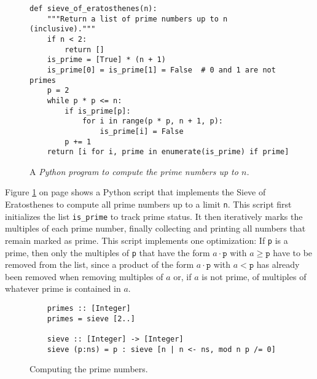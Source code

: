 \begin{figure}[!ht]
\centering
\begin{verbatim}
def sieve_of_eratosthenes(n):
    """Return a list of prime numbers up to n (inclusive)."""
    if n < 2:
        return []    
    is_prime = [True] * (n + 1)
    is_prime[0] = is_prime[1] = False  # 0 and 1 are not primes
    p = 2
    while p * p <= n:
        if is_prime[p]:
            for i in range(p * p, n + 1, p):
                is_prime[i] = False
        p += 1
    return [i for i, prime in enumerate(is_prime) if prime]
\end{verbatim}
\vspace*{-0.3cm}
\caption{A \textsl{Python program to compute the prime numbers up to $n$.}}
\label{fig:primes.py}
\end{figure}
Figure \ref{fig:primes.py} on page \pageref{fig:primes.py} shows a Python script that implements the Sieve of
Eratosthenes to compute all prime numbers up to a limit \texttt{n}.  This script first initializes the list
\texttt{is\_prime} to track prime status. It then iteratively marks the multiples of each prime number, finally
collecting and printing all numbers that remain marked as prime.  This script implements one optimization: If
\texttt{p} is a prime, then only the multiples of \texttt{p} that have the form $a \cdot \mathtt{p}$ with
$a \geq \mathtt{p}$ have to be removed from the list, since a product of the form $a \cdot \mathtt{p}$ with
$a < \mathtt{p}$ has already been removed when removing multiples  
of $a$ or, if $a$ is not prime, of multiples of whatever prime is contained in $a$.



\begin{figure}[!ht]
\centering
\begin{verbatim}
    primes :: [Integer]
    primes = sieve [2..]
    
    sieve :: [Integer] -> [Integer]
    sieve (p:ns) = p : sieve [n | n <- ns, mod n p /= 0]
\end{verbatim}
\vspace*{-0.3cm}
\caption{Computing the prime numbers.}
\label{fig:primes.hs}
\end{figure}

